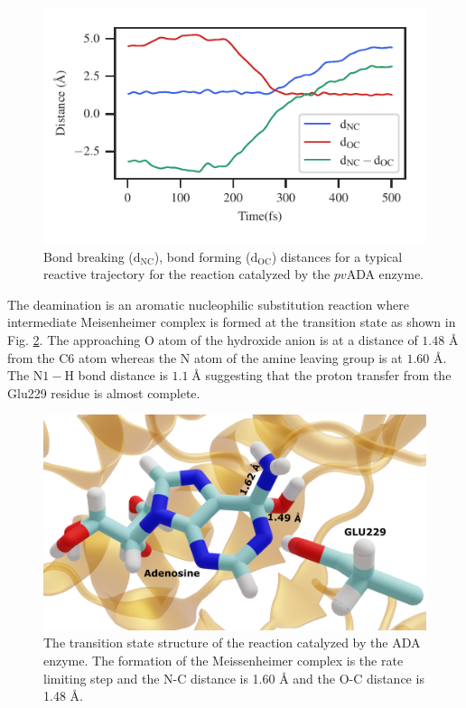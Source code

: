 \documentclass[journal=jpcbfk,manuscript=article,layout=traditional]{achemso}
\begin{document}
\begin{figure}[ht!]
\includegraphics[scale=1.0]{figures/ada-diff60.pdf}
\caption{Bond breaking ($\mathrm{d}_{\mathrm{NC}}$), bond forming 
($\mathrm{d}_{\mathrm{OC}}$) distances for a typical 
reactive trajectory for the reaction catalyzed by the $pv$ADA enzyme.}
\label{fig:ada-reactive-traj}
\end{figure}
The deamination is an aromatic nucleophilic substitution reaction 
where intermediate Meisenheimer complex is formed at the transition state
as shown in Fig. \ref{fig:ada-trans}. 
The approaching O atom of the hydroxide anion is at a distance of $1.48$ {\AA}
from the C6 atom whereas the N atom of the amine leaving group is at $1.60$ {\AA}.
The N$1-$H bond distance is $1.1\;${\AA} 
suggesting that the proton transfer from the Glu229 residue is almost complete.
\begin{figure}
\centering
\includegraphics[scale=0.12]{blender-images/ada/new-ada-trans.png}
\caption{The transition state structure of the reaction catalyzed by the ADA enzyme.
The formation of the Meissenheimer complex is the rate limiting step and the N-C distance is 
1.60 {\AA} and the O-C distance is 1.48 {\AA}.}
\label{fig:ada-trans}
\end{figure}
\end{document}
